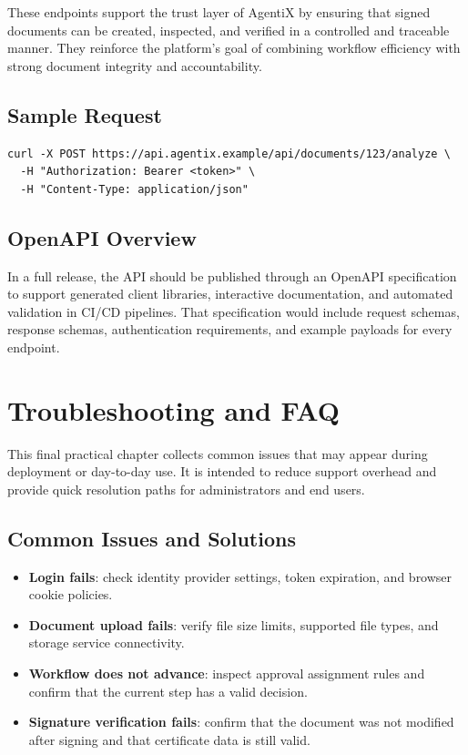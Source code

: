 \documentclass[12pt,oneside,openright,a4paper]{cpe-english-project}
\begin{document}
These endpoints support the trust layer of AgentiX by ensuring that signed documents can be created, inspected, and verified in a controlled and traceable manner. They reinforce the platform's goal of combining workflow efficiency with strong document integrity and accountability.

\section{Sample Request}

\begin{verbatim}
curl -X POST https://api.agentix.example/api/documents/123/analyze \
  -H "Authorization: Bearer <token>" \
  -H "Content-Type: application/json"
\end{verbatim}

\section{OpenAPI Overview}

In a full release, the API should be published through an OpenAPI specification to support generated client libraries, interactive documentation, and automated validation in CI/CD pipelines. That specification would include request schemas, response schemas, authentication requirements, and example payloads for every endpoint.

\newpage

\chapter{Troubleshooting and FAQ}

This final practical chapter collects common issues that may appear during deployment or day-to-day use. It is intended to reduce support overhead and provide quick resolution paths for administrators and end users.

\section{Common Issues and Solutions}

\begin{itemize}
  \item \textbf{Login fails}: check identity provider settings, token expiration, and browser cookie policies.
  \item \textbf{Document upload fails}: verify file size limits, supported file types, and storage service connectivity.
  \item \textbf{Workflow does not advance}: inspect approval assignment rules and confirm that the current step has a valid decision.
  \item \textbf{Signature verification fails}: confirm that the document was not modified after signing and that certificate data is still valid.
\end{itemize}
\end{document}
